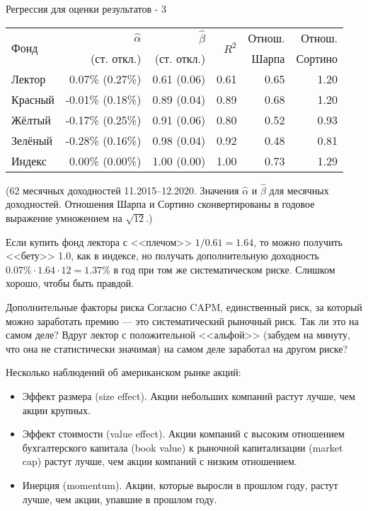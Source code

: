 \documentclass{beamer}
\begin{document}
\begin{frame}{Регрессия для оценки результатов - 3}
\center
\begin{tabular}{l|r|r|r|r|r}
\multirow{2}{*}{Фонд}    & $\hat{\alpha}$ & $\hat{\beta}$ & \multirow{2}{*}{$R^2$} & Отнош. & Отнош. \\
& \scriptsize{(ст. откл.)} & \scriptsize{(ст. откл.)} & & Шарпа & Сортино \\ \hline
Лектор  &  0.07\% \scriptsize{(0.27\%)} & 0.61 \scriptsize{(0.06)}   &  0.61 & 0.65 & 1.20 \\
Красный & -0.01\% \scriptsize{(0.18\%)} & 0.89 \scriptsize{(0.04)}   &  0.89 & 0.68 & 1.20 \\
Жёлтый  & -0.17\% \scriptsize{(0.25\%)} & 0.91 \scriptsize{(0.06)}   &  0.80 & 0.52 & 0.93 \\
Зелёный & -0.28\% \scriptsize{(0.16\%)} & 0.98 \scriptsize{(0.04)}   &  0.92 & 0.48 & 0.81 \\ \hline
Индекс  & 0.00\% \scriptsize{(0.00\%)}  & 1.00 \scriptsize{(0.00)}   &  1.00 & 0.73 & 1.29
\end{tabular}
\justify
{\scriptsize(62 месячных доходностей 11.2015--12.2020. Значения $\hat{\alpha}$ и $\hat{\beta}$ для месячных доходностей. Отношения Шарпа и Сортино сконвертированы в годовое выражение умножением на $\sqrt{12}$.)}

\vspace{\baselineskip}
Если купить фонд лектора с <<плечом>> $1/0.61 = 1.64$, то можно получить <<бету>> 1.0, как в индексе, но получать дополнительную доходность $0.07\% \cdot 1.64 \cdot 12 = 1.37\%$ в год при том же систематическом риске. Слишком хорошо, чтобы быть правдой.
\end{frame}



\begin{frame}{Дополнительные факторы риска}
\justify
Согласно CAPM, единственный риск, за который можно заработать премию --- это систематический рыночный риск. Так ли это на самом деле? Вдруг лектор с положительной <<альфой>> (забудем на минуту, что она не статистически значимая) на самом деле заработал на другом риске?

\vspace{\baselineskip}
Несколько наблюдений об американском рынке акций:
\begin{itemize}
\justifying
\item Эффект размера (size effect). Акции небольших компаний растут лучше, чем акции крупных.
\item Эффект стоимости (value effect). Акции компаний с высоким отношением бухгалтерского капитала (book value) к рыночной капитализации (market cap) растут лучше, чем акции компаний с низким отношением.
\item Инерция (momentum). Акции, которые выросли в прошлом году, растут лучше, чем акции, упавшие в прошлом году.
\end{itemize}
\end{frame}
\end{document}
